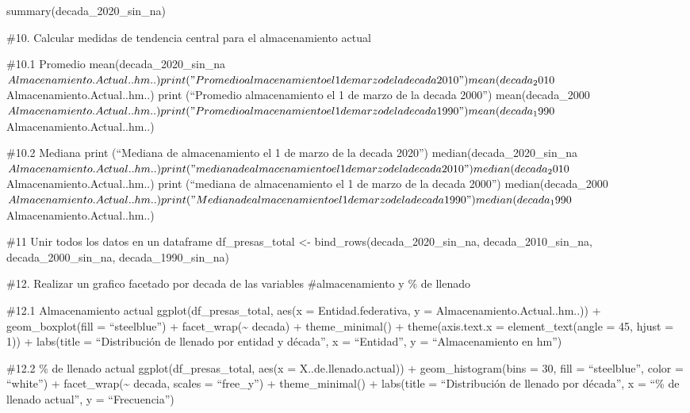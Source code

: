 \documentclass[
]{article}
\begin{document}
summary(decada\_2020\_sin\_na)

\#10. Calcular medidas de tendencia central para el almacenamiento
actual

\#10.1 Promedio mean(decada\_2020\_sin\_na\(Almacenamiento.Actual..hm..)
print ("Promedio almacenamiento el 1 de marzo de la decada 2010")
mean(decada_2010\)Almacenamiento.Actual..hm..) print (``Promedio
almacenamiento el 1 de marzo de la decada 2000'')
mean(decada\_2000\(Almacenamiento.Actual..hm..)
print ("Promedio almacenamiento el 1 de marzo de la decada 1990")
mean(decada_1990\)Almacenamiento.Actual..hm..)

\#10.2 Mediana print (``Mediana de almacenamiento el 1 de marzo de la
decada 2020'')
median(decada\_2020\_sin\_na\(Almacenamiento.Actual..hm..)
print ("mediana de almacenamiento el 1 de marzo de la decada 2010")
median(decada_2010\)Almacenamiento.Actual..hm..) print (``mediana de
almacenamiento el 1 de marzo de la decada 2000'')
median(decada\_2000\(Almacenamiento.Actual..hm..)
print ("Mediana de almacenamiento el 1 de marzo de la decada 1990")
median(decada_1990\)Almacenamiento.Actual..hm..)

\#11 Unir todos los datos en un dataframe df\_presas\_total \textless-
bind\_rows(decada\_2020\_sin\_na, decada\_2010\_sin\_na,
decada\_2000\_sin\_na, decada\_1990\_sin\_na)

\#12. Realizar un grafico facetado por decada de las variables
\#almacenamiento y \% de llenado

\#12.1 Almacenamiento actual ggplot(df\_presas\_total, aes(x =
Entidad.federativa, y = Almacenamiento.Actual..hm..)) +
geom\_boxplot(fill = ``steelblue'') + facet\_wrap(\textasciitilde{}
decada) + theme\_minimal() + theme(axis.text.x = element\_text(angle =
45, hjust = 1)) + labs(title = ``Distribución de llenado por entidad y
década'', x = ``Entidad'', y = ``Almacenamiento en hm'')

\#12.2 \% de llenado actual ggplot(df\_presas\_total, aes(x =
X..de.llenado.actual)) + geom\_histogram(bins = 30, fill =
``steelblue'', color = ``white'') + facet\_wrap(\textasciitilde{}
decada, scales = ``free\_y'') + theme\_minimal() + labs(title =
``Distribución de llenado por década'', x = ``\% de llenado actual'', y
= ``Frecuencia'')
\end{document}
